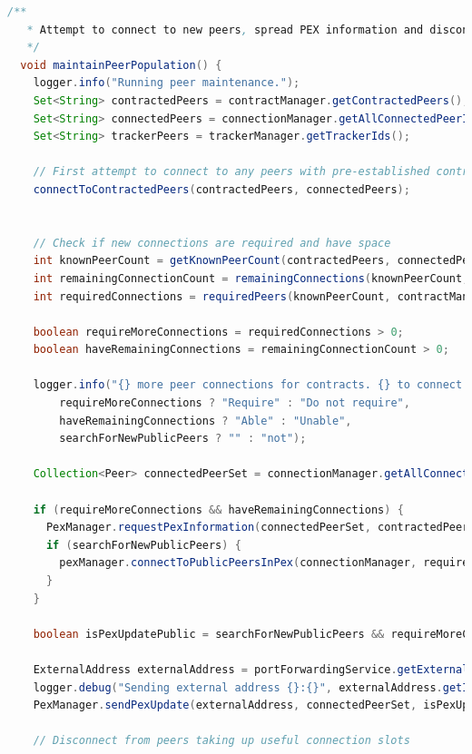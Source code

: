 \documentclass[11pt, a4paper, twocolumn, twoside]{report}
\begin{document}
\begin{lstlisting}[language=Java, caption=Peer Population Control, label=lst:peerPop]
  /**
   * Attempt to connect to new peers, spread PEX information and disconnect redundant peers.
   */
  void maintainPeerPopulation() {
    logger.info("Running peer maintenance.");
    Set<String> contractedPeers = contractManager.getContractedPeers();
    Set<String> connectedPeers = connectionManager.getAllConnectedPeerIds();
    Set<String> trackerPeers = trackerManager.getTrackerIds();

    // First attempt to connect to any peers with pre-established contracts
    connectToContractedPeers(contractedPeers, connectedPeers);


    // Check if new connections are required and have space
    int knownPeerCount = getKnownPeerCount(contractedPeers, connectedPeers, friendPeers, trackerPeers);
    int remainingConnectionCount = remainingConnections(knownPeerCount, maxConnections);
    int requiredConnections = requiredPeers(knownPeerCount, contractManager.getContractCountTarget());

    boolean requireMoreConnections = requiredConnections > 0;
    boolean haveRemainingConnections = remainingConnectionCount > 0;

    logger.info("{} more peer connections for contracts. {} to connect to more peers. Should {} connect to new public peers",
        requireMoreConnections ? "Require" : "Do not require",
        haveRemainingConnections ? "Able" : "Unable",
        searchForNewPublicPeers ? "" : "not");

    Collection<Peer> connectedPeerSet = connectionManager.getAllConnectedPeers();

    if (requireMoreConnections && haveRemainingConnections) {
      PexManager.requestPexInformation(connectedPeerSet, contractedPeers, searchForNewPublicPeers);
      if (searchForNewPublicPeers) {
        pexManager.connectToPublicPeersInPex(connectionManager, requiredConnections);
      }
    }

    boolean isPexUpdatePublic = searchForNewPublicPeers && requireMoreConnections;

    ExternalAddress externalAddress = portForwardingService.getExternalAddress();
    logger.debug("Sending external address {}:{}", externalAddress.getIpAddress(), externalAddress.getPort());
    PexManager.sendPexUpdate(externalAddress, connectedPeerSet, isPexUpdatePublic);

    // Disconnect from peers taking up useful connection slots


\end{lstlisting}
\end{document}
